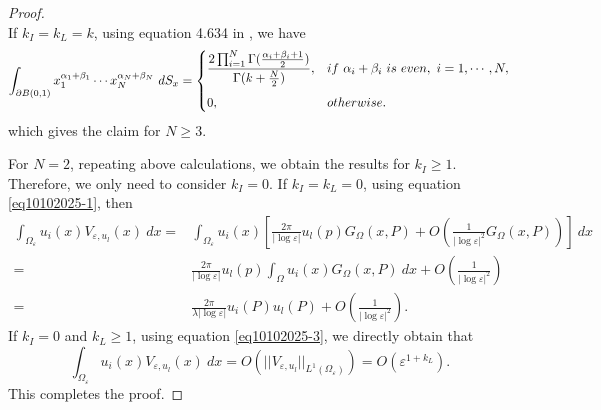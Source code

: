 \documentclass[11pt,reqno]{article}
\numberwithin{equation}{section}
\newcommand\e\varepsilon
\renewcommand\O\Omega
\begin{document}
\begin{proof}
\begin{equation}
        \end{equation}
         If ${ k_I}={ k_L}=k$,
        using equation 4.634 in \cite{Gradshteyn2007}, we have
        \begin{equation}
            \int_{\partial B(0,1)} x_{1}^{\alpha_1+\beta_1}\cdots x_{N}^{\alpha_N+\beta_N} \ d S_x=
            \begin{cases}
              \displaystyle \frac{2\prod_{i=1}^N\Gamma(\frac{\alpha_i+\beta_i+1}{2})}{\Gamma(k+\frac{N}{2})},  &if\ \alpha_i+\beta_i\ is  \ even, \ i=1,\cdots,N,\vspace{2mm}\\
                0,& otherwise.
            \end{cases}
        \end{equation}
 which gives the claim for $N\ge3$.

        For $N=2$,  repeating above calculations, we obtain the results for ${ k_I}\ge1$. Therefore, we only need to consider ${ k_I}=0$. If ${ k_I}={ k_L}=0$, using equation \eqref{eq10102025-1}, then
        \begin{equation}
            \begin{aligned}
                \int_{\O_\e}u_i(x) V_{\e,u_l}(x)\ dx= &\int_{\O_\e}u_i(x) \left[\frac{2\pi}{|\log \e|}u_l(p)G_\Omega(x,P)+O\left(\frac{1}{|\log \e|^2}G_\Omega(x,P)\right)\right]\ dx\\
                 =&\frac{2\pi}{|\log \e|}u_l(p)\int_{\O}u_i(x) G_\Omega(x,P)\ dx+O\left(\frac{1}{|\log \e|^2}\right)\\
                 =&\frac{2\pi}{\lambda|\log \e|}u_i(P)u_l(P)+O\left(\frac{1}{|\log \e|^2}\right).
            \end{aligned}
        \end{equation}
        If $k_I=0$ and ${ k_L}\ge1$, using equation \eqref{eq10102025-3}, we directly obtain that 
        $$ \int_{\O_\e}u_i(x) V_{\e,u_l}(x)\ dx=O\left(||V_{\e,u_l}||_{L^1(\O_\e)}\right)=O(\e^{1+{ k_L}}).
        $$
      This completes the proof.
    \end{proof}
\end{document}
